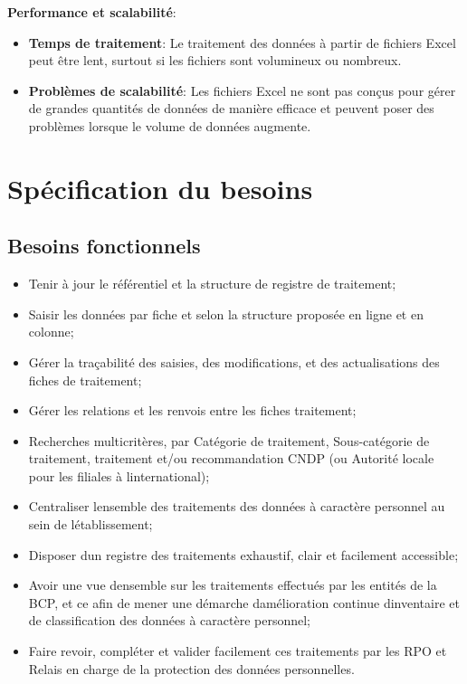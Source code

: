 \noindent \textbf{Performance et scalabilité}:
\begin{itemize}
    \item \textbf{Temps de traitement}: Le traitement des données à partir de fichiers Excel peut être lent, surtout si les fichiers sont volumineux ou nombreux.
    \item \textbf{Problèmes de scalabilité}: Les fichiers Excel ne sont pas conçus pour gérer de grandes quantités de données de manière efficace et peuvent poser des problèmes lorsque le volume de données augmente.
\end{itemize}
\vspace{.4cm}

\clearpage


\section{Spécification du besoins}

\subsection{Besoins fonctionnels}
\vspace{.4cm}
\begin{itemize}
    \item Tenir à jour le référentiel et la structure de registre de traitement; \vspace{.2cm}
    \item Saisir les données par fiche et selon la structure proposée en ligne et en colonne; \vspace{.2cm}
    \item Gérer la traçabilité des saisies, des modifications, et des actualisations des fiches de traitement; \vspace{.2cm}
    \item Gérer les relations et les renvois entre les fiches traitement; \vspace{.2cm}
    \item Recherches multicritères, par Catégorie de traitement, Sous-catégorie de traitement, traitement et/ou recommandation CNDP (ou Autorité locale pour les filiales à linternational); \vspace{.2cm}
    \item Centraliser lensemble des traitements des données à caractère personnel au sein de létablissement; \vspace{.2cm}
    \item Disposer dun registre des traitements exhaustif, clair et facilement accessible; \vspace{.2cm}
    \item Avoir une vue densemble sur les traitements effectués par les entités de la BCP, et ce afin de mener une démarche damélioration continue dinventaire et de classification des données à caractère personnel; \vspace{.2cm}
    \item Faire revoir, compléter et valider facilement ces traitements par les RPO et Relais en charge de la protection des données personnelles.
\end{itemize}



